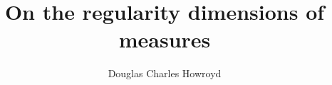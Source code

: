 \documentclass[a4paper]{report}
\title{On the regularity dimensions of measures}
\author{Douglas Charles Howroyd}
\theoremstyle{definition}
\begin{document}
 \null \newpage
 


\onehalfspacing



\singlespacing
\tableofcontents
\onehalfspacing

\begin{large}









\end{large}


\singlespacing
\printnomenclature
\clearpage
{}
\onehalfspacing

\singlespacing



\begin{large}
 
\end{large}
\end{document}
